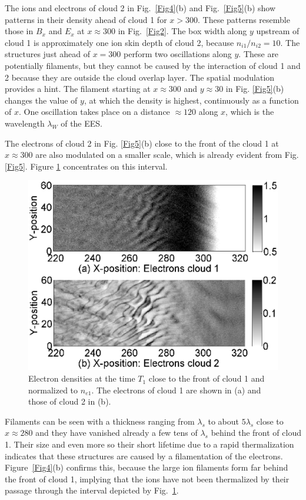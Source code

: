 \documentclass[structabstract]{aa}
\begin{document}
The ions and electrons of cloud 2 in Fig.~\ref{Fig4}(b) and 
Fig.~\ref{Fig5}(b) show patterns in their density ahead of cloud 1 for 
$x>300$. These patterns resemble those in $B_x$ and $E_x$ at $x \approx 
300$ in Fig.~\ref{Fig2}. The box width along $y$ upstream of cloud 1 is 
approximately one ion skin depth of cloud 2, because $n_{i1}/n_{i2} = 10$. 
The structures just ahead of $x=300$ perform two oscillations along $y$. 
These are potentially filaments, but they cannot be caused by the 
interaction of cloud 1 and 2 because they are outside the cloud overlap 
layer. The spatial modulation provides a hint. The filament starting at 
$x \approx 300$ and $y\approx 30$ in Fig. \ref{Fig5}(b) changes the value 
of $y$, at which the density is highest, continuously as a function of $x$. 
One oscillation takes place on a distance $\approx 120$ along $x$, which is 
the wavelength $\lambda_W$ of the EES.

The electrons of cloud 2 in Fig. \ref{Fig5}(b) close to the front of the 
cloud 1 at $x\approx 300$ are also modulated on a smaller scale, which
is already evident from Fig. \ref{Fig5}. Figure \ref{Fig6} concentrates
on this interval. 
\begin{figure}
\centering
\includegraphics[width=\columnwidth]{Fig6.eps}
\caption{Electron densities at the time $T_1$ close to the front of cloud
1 and normalized to $n_{e1}$. The electrons of cloud 1 are shown in (a) and 
those of cloud 2 in (b).}\label{Fig6}
\end{figure}
Filaments can be seen with a thickness ranging from $\lambda_s$ to about 
$5\lambda_s$ close to $x\approx 280$ and they have vanished already 
a few tens of $\lambda_s$ behind the front of cloud 1. Their size and 
even more so their short lifetime due to a rapid thermalization indicates 
that these structures are caused by a filamentation of the electrons. 
Figure~\ref{Fig4}(b) confirms this, because the large ion filaments form 
far behind the front of cloud 1, implying that the ions have not been 
thermalized by their passage through the interval depicted by Fig.~\ref{Fig6}.
\end{document}
